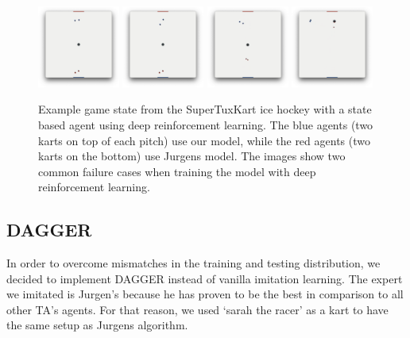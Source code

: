 \documentclass[10pt,twocolumn,letterpaper]{article}
\begin{document}
\begin{figure}
  \centering
  \includegraphics[width=0.24\textwidth]{figures/bf.png}
  \includegraphics[width=0.24\textwidth]{figures/bf2.png}
  \includegraphics[width=0.24\textwidth]{figures/corner.png}
  \includegraphics[width=0.24\textwidth]{figures/corner2.png}
  \caption{Example game state from the SuperTuxKart ice hockey with a state based agent using deep reinforcement learning. The blue agents (two karts on top of each pitch) use our model, while the red agents (two karts on the bottom) use Jurgens model. The images show two common failure cases when training the model with deep reinforcement learning.}
\end{figure}

\subsection{DAGGER}
In order to overcome mismatches in the training and testing distribution, we decided to implement DAGGER instead of vanilla imitation learning. The expert we imitated is Jurgen’s because he has proven to be the best in comparison to all other TA’s agents. For that reason, we used ‘sarah the racer’ as a kart to have the same setup as Jurgens algorithm.
\end{document}
